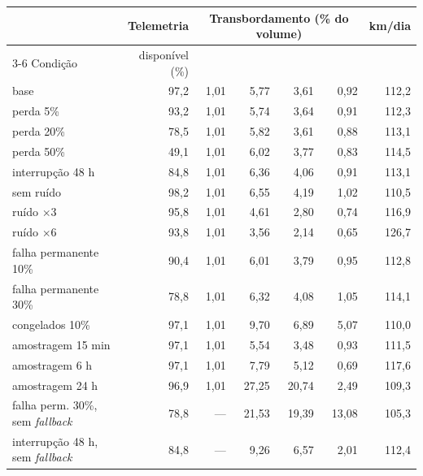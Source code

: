 \begin{tabular}{@{}lrrrrrr@{}}
\toprule
 & Telemetria & \multicolumn{4}{c}{Transbordamento (\% do volume)} & km/dia \\
\cmidrule(lr){3-6}
Condição & disponível (\%) & \polA{} & \polBOR{} & \polC{} & \polD{} & \polD{} \\
\midrule
base & 97,2 & 1,01 & 5,77 & 3,61 & 0,92 & 112,2 \\
perda 5\% & 93,2 & 1,01 & 5,74 & 3,64 & 0,91 & 112,3 \\
perda 20\% & 78,5 & 1,01 & 5,82 & 3,61 & 0,88 & 113,1 \\
perda 50\% & 49,1 & 1,01 & 6,02 & 3,77 & 0,83 & 114,5 \\
interrupção 48 h & 84,8 & 1,01 & 6,36 & 4,06 & 0,91 & 113,1 \\
sem ruído & 98,2 & 1,01 & 6,55 & 4,19 & 1,02 & 110,5 \\
ruído $\times$3 & 95,8 & 1,01 & 4,61 & 2,80 & 0,74 & 116,9 \\
ruído $\times$6 & 93,8 & 1,01 & 3,56 & 2,14 & 0,65 & 126,7 \\
falha permanente 10\% & 90,4 & 1,01 & 6,01 & 3,79 & 0,95 & 112,8 \\
falha permanente 30\% & 78,8 & 1,01 & 6,32 & 4,08 & 1,05 & 114,1 \\
congelados 10\% & 97,1 & 1,01 & 9,70 & 6,89 & 5,07 & 110,0 \\
amostragem 15 min & 97,1 & 1,01 & 5,54 & 3,48 & 0,93 & 111,5 \\
amostragem 6 h & 97,1 & 1,01 & 7,79 & 5,12 & 0,69 & 117,6 \\
amostragem 24 h & 96,9 & 1,01 & 27,25 & 20,74 & 2,49 & 109,3 \\
falha perm. 30\%, sem \emph{fallback} & 78,8 & --- & 21,53 & 19,39 & 13,08 & 105,3 \\
interrupção 48 h, sem \emph{fallback} & 84,8 & --- & 9,26 & 6,57 & 2,01 & 112,4 \\
\bottomrule
\end{tabular}
